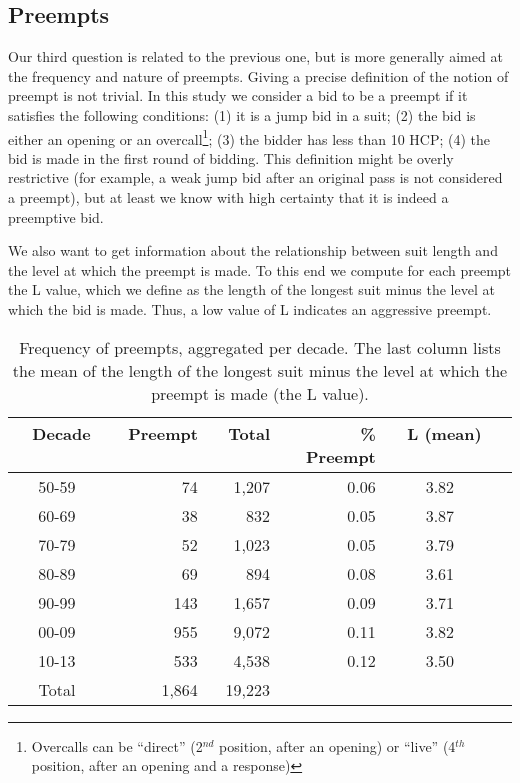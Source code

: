 \documentclass{icga}
\begin{document}
\subsection{Preempts}

Our third question is related to the previous one, but is more
generally aimed at the frequency and nature of preempts. Giving a
precise definition of the notion of preempt is not trivial. In this
study we consider a bid to be a preempt if it satisfies the following
conditions: (1) it is a jump bid in a suit; (2) the bid is either an
opening or an overcall\footnote{%
  Overcalls can be ``direct'' (2$^{nd}$ position, after an opening) or
  ``live'' (4$^{th}$ position, after an opening and a response)}; (3)
the bidder has less than 10 HCP; (4) the bid is made in the first
round of bidding.  This definition might be overly restrictive (for
example, a weak jump bid after an original pass is not considered a
preempt), but at least we know with high certainty that it is indeed a
preemptive bid.

We also want to get information about the relationship between suit
length and the level at which the preempt is made. To this end we
compute for each preempt the L value, which we define as the length of
the longest suit minus the level at which the bid is made.  Thus, a
low value of L indicates an aggressive preempt.

\begin{table}
\centering\footnotesize
\begin{tabular}{|c|r|r|r|c|c|}
\hline
\bf \ Decade \ & \bf Preempt \ & \bf Total  \ & 
\bf \% Preempt & \bf \ L (mean) \  \\ 
\hline\hline
50-59 & 74 & 1,207 & 0.06 & 3.82 \\ 
60-69 & 38 & 832& 0.05 & 3.87 \\
70-79 & 52 & 1,023 & 0.05 & 3.79 \\
80-89 & 69 & 894 & 0.08 & 3.61 \\
90-99 & 143 & 1,657 & 0.09 & 3.71 \\
00-09 & 955 & 9,072 & 0.11 & 3.82 \\ 
10-13 & 533 & 4,538 & 0.12 & 3.50 \\
\hline
Total  & 1,864 & 19,223 &  & \\ 
\hline
\end{tabular}
\caption{Frequency of preempts, aggregated per decade. The last column
lists the mean of the length of the longest suit minus the level at
which the preempt is made (the L value).}
\label{tbl:preempt}
\end{table}
\end{document}
